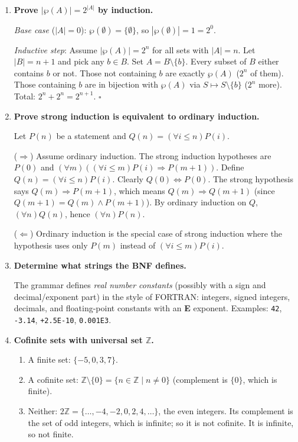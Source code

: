 \documentclass[11pt]{book}
\def\ZN{\mathbb{Z}}
\begin{document}
\begin{enumerate}[{0.}1. ]
\item \textbf{Prove $|\wp(A)| = 2^{|A|}$ by induction.}

\textit{Base case} ($|A|=0$): $\wp(\emptyset)=\{\emptyset\}$, so $|\wp(\emptyset)|=1=2^0$. \checkmark

\textit{Inductive step}: Assume $|\wp(A)|=2^n$ for all sets with $|A|=n$. Let $|B|=n+1$ and pick any $b\in B$. Set $A=B\setminus\{b\}$. Every subset of $B$ either contains $b$ or not. Those not containing $b$ are exactly $\wp(A)$ ($2^n$ of them). Those containing $b$ are in bijection with $\wp(A)$ via $S\mapsto S\setminus\{b\}$ ($2^n$ more). Total: $2^n+2^n=2^{n+1}$. $\square$

\item \textbf{Prove strong induction is equivalent to ordinary induction.}

Let $P(n)$ be a statement and $Q(n) = (\forall i \leq n) P(i)$.

($\Rightarrow$) Assume ordinary induction. The strong induction hypotheses are $P(0)$ and $(\forall m)((\forall i\leq m)P(i)\Rightarrow P(m+1))$. Define $Q(n) = (\forall i\leq n)P(i)$. Clearly $Q(0)\Leftrightarrow P(0)$. The strong hypothesis says $Q(m)\Rightarrow P(m+1)$, which means $Q(m)\Rightarrow Q(m+1)$ (since $Q(m+1) = Q(m)\wedge P(m+1)$). By ordinary induction on $Q$, $(\forall n)Q(n)$, hence $(\forall n)P(n)$.

($\Leftarrow$) Ordinary induction is the special case of strong induction where the hypothesis uses only $P(m)$ instead of $(\forall i\leq m)P(i)$.

\item \textbf{Determine what strings the BNF defines.}

The grammar defines \emph{real number constants} (possibly with a sign and decimal/exponent part) in the style of FORTRAN: integers, signed integers, decimals, and floating-point constants with an \textbf{E} exponent. Examples: \texttt{42}, \texttt{-3.14}, \texttt{+2.5E-10}, \texttt{0.001E3}.

\item \textbf{Cofinite sets with universal set $\ZN$.}

\begin{enumerate}
\item A finite set: $\{-5,0,3,7\}$.
\item A cofinite set: $\ZN\setminus\{0\} = \{n\in\ZN \mid n\neq 0\}$ (complement is $\{0\}$, which is finite).
\item Neither: $2\ZN = \{\ldots,-4,-2,0,2,4,\ldots\}$, the even integers. Its complement is the set of odd integers, which is infinite; so it is not cofinite. It is infinite, so not finite.
\end{enumerate}


\end{enumerate}
\end{document}
